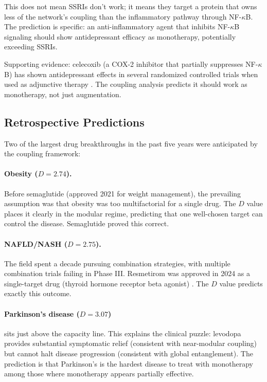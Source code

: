 \documentclass[11pt,a4paper]{article}
\begin{document}
This does not mean SSRIs don't work; it means they target a protein that owns less of the network's coupling than the inflammatory pathway through NF-$\kappa$B. The prediction is specific: an anti-inflammatory agent that inhibits NF-$\kappa$B signaling should show antidepressant efficacy as monotherapy, potentially exceeding SSRIs.

Supporting evidence: celecoxib (a COX-2 inhibitor that partially suppresses NF-$\kappa$B) has shown antidepressant effects in several randomized controlled trials when used as adjunctive therapy \citep{akhondzadeh2009,muller2006}. The coupling analysis predicts it should work as monotherapy, not just augmentation.

\subsection{Retrospective Predictions}

Two of the largest drug breakthroughs in the past five years were anticipated by the coupling framework:

\paragraph{Obesity ($D = 2.74$).} Before semaglutide \citep{wilding2021} (approved 2021 for weight management), the prevailing assumption was that obesity was too multifactorial for a single drug. The $D$ value places it clearly in the modular regime, predicting that one well-chosen target can control the disease. Semaglutide proved this correct.

\paragraph{NAFLD/NASH ($D = 2.75$).} The field spent a decade pursuing combination strategies, with multiple combination trials failing in Phase III. Resmetirom was approved in 2024 as a single-target drug (thyroid hormone receptor beta agonist) \citep{harrison2024}. The $D$ value predicts exactly this outcome.

\paragraph{Parkinson's disease ($D = 3.07$)} sits just above the capacity line. This explains the clinical puzzle: levodopa provides substantial symptomatic relief (consistent with near-modular coupling) but cannot halt disease progression (consistent with global entanglement). The prediction is that Parkinson's is the hardest disease to treat with monotherapy among those where monotherapy appears partially effective.
\end{document}
